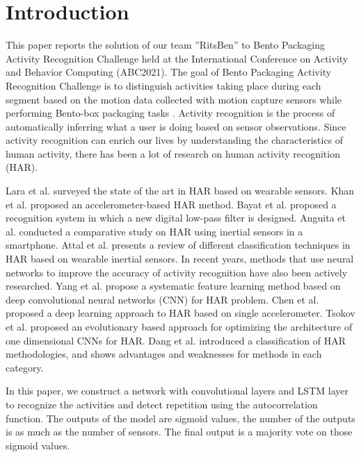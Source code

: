 \documentclass[graybox]{svmult}
\begin{document}
\section{Introduction}
\label{sec:introduction}
This paper reports the solution of our team ''RitsBen'' to Bento Packaging Activity Recognition Challenge held at the International Conference on Activity and Behavior Computing (ABC2021). The goal of Bento Packaging Activity Recognition Challenge is to distinguish activities taking place during each segment based on the motion data collected with motion capture sensors while performing Bento-box packaging tasks \cite{ex1}. Activity recognition is the process of automatically inferring what a user is doing based on sensor observations. Since activity recognition can enrich our lives by understanding the characteristics of human activity, there has been a lot of research on human activity recognition (HAR).\par

Lara et al. \cite{lara2012survey} surveyed  the state of the art in HAR based on wearable sensors.
Khan et al. \cite{khan2010triaxial} proposed an accelerometer-based HAR method.
Bayat et al. \cite{bayat2014study} proposed a recognition system in which a new digital low-pass filter is designed.
Anguita et al. \cite{anguita2012human} conducted a comparative study on HAR using inertial sensors in a smartphone.
Attal et al. \cite{attal2015physical} presents a review of different classification techniques in HAR based on wearable inertial sensors.
In recent years, methods that use neural networks to improve the accuracy of activity recognition have also been actively researched.
Yang et al. \cite{yang2015deep} propose a systematic feature learning method based on deep convolutional neural networks (CNN) for HAR problem.
Chen et al. \cite{chen2015deep} proposed a deep learning approach to HAR based on single accelerometer. 
Tsokov et al. \cite{tsokov2021evolutionary} proposed an evolutionary based approach for optimizing the architecture of one dimensional CNNs for HAR.
Dang et al. \cite{dang2020sensor} introduced a classification of HAR methodologies, and shows advantages and weaknesses for methods in each category.\par

In this paper, we construct a network with convolutional layers and LSTM layer to recognize the activities and detect repetition using the autocorrelation function. The outputs of the model are sigmoid values, the number of the outputs is as much as the number of sensors. The final output is a majority vote on those sigmoid values.
\end{document}
